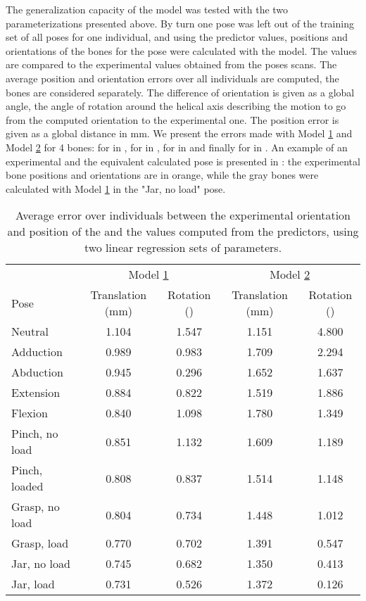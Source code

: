 The generalization capacity of the model was tested with the two parameterizations presented above. By turn one pose was left out of the training set of all poses for one individual, and using the predictor values, positions and orientations of the bones for the pose were calculated with the model. The values are compared to the experimental values obtained from the poses scans. The average position and orientation errors over all individuals are computed, the bones are considered separately. The difference of orientation is given as a global angle, the angle of rotation around the helical axis describing the motion to go from the computed orientation to the experimental one. The position error is given as a global distance in mm. We present the errors made with Model \hyperref[model1]{1} and Model \hyperref[model2]{2} for 4 bones: for \mcu* in , for \mct* in , for \lun* in  and finally for \ham* in . An example of an experimental and the equivalent calculated pose is presented in : the experimental bone positions and orientations are in orange, while the gray bones were calculated with Model \hyperref[model1]{1} in the "Jar, no load" pose.

\begin{table}[!ht]
	\centering
	\begin{tabular}{lcc|cc}
		\toprule
			\mcu* & \multicolumn{2}{c}{Model \hyperref[model1]{1}} & \multicolumn{2}{c}{Model \hyperref[model2]{2}} \\
			Pose & Translation (mm) & Rotation (\degre) & Translation (mm) & Rotation (\degre) \\
		\midrule
			Neutral 		 & 1.104 	 & 1.547 	 & 1.151 	 & 4.800 \\
			Adduction 		 & 0.989 	 & 0.983 	 & 1.709 	 & 2.294 \\
			Abduction 		 & 0.945 	 & 0.296 	 & 1.652 	 & 1.637 \\
			Extension 		 & 0.884 	 & 0.822 	 & 1.519 	 & 1.886 \\
			Flexion 		 & 0.840 	 & 1.098 	 & 1.780 	 & 1.349 \\
			Pinch, no load 	 & 0.851 	 & 1.132 	 & 1.609 	 & 1.189 \\
			Pinch, loaded 	 & 0.808 	 & 0.837 	 & 1.514 	 & 1.148 \\
			Grasp, no load 	 & 0.804 	 & 0.734 	 & 1.448 	 & 1.012 \\
			Grasp, load 	 & 0.770 	 & 0.702 	 & 1.391 	 & 0.547 \\
			Jar, no load 	 & 0.745 	 & 0.682 	 & 1.350 	 & 0.413 \\
			Jar, load 		 & 0.731 	 & 0.526 	 & 1.372 	 & 0.126 \\
		\bottomrule
	\end{tabular}
	\caption[Generalization capacity of the statistical movement model for the \mcu*]{Average error over individuals between the experimental orientation and position of the \mcu* and the values computed from the predictors, using two linear regression sets of parameters.}
	\label{tab:linreg_mc1}
\end{table}



